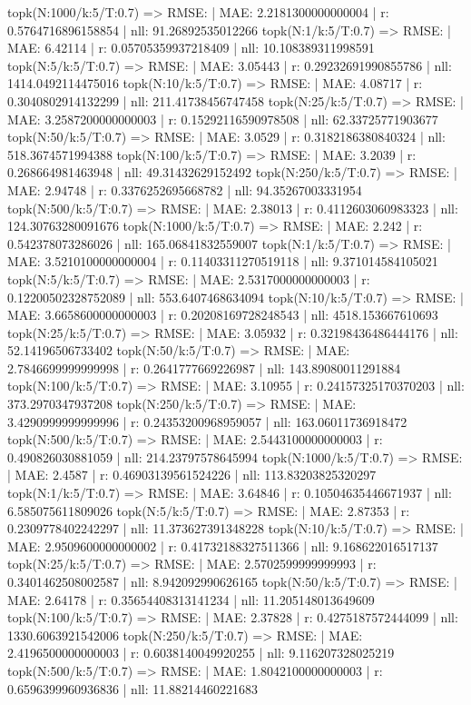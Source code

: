 topk(N:1000/k:5/T:0.7) => RMSE: | MAE: 2.2181300000000004 | r: 0.5764716896158854 | nll: 91.26892535012266
topk(N:1/k:5/T:0.7) => RMSE: | MAE: 6.42114 | r: 0.05705359937218409 | nll: 10.108389311998591
topk(N:5/k:5/T:0.7) => RMSE: | MAE: 3.05443 | r: 0.29232691990855786 | nll: 1414.0492114475016
topk(N:10/k:5/T:0.7) => RMSE: | MAE: 4.08717 | r: 0.3040802914132299 | nll: 211.41738456747458
topk(N:25/k:5/T:0.7) => RMSE: | MAE: 3.2587200000000003 | r: 0.15292116590978508 | nll: 62.33725771903677
topk(N:50/k:5/T:0.7) => RMSE: | MAE: 3.0529 | r: 0.3182186380840324 | nll: 518.3674571994388
topk(N:100/k:5/T:0.7) => RMSE: | MAE: 3.2039 | r: 0.268664981463948 | nll: 49.31432629152492
topk(N:250/k:5/T:0.7) => RMSE: | MAE: 2.94748 | r: 0.3376252695668782 | nll: 94.35267003331954
topk(N:500/k:5/T:0.7) => RMSE: | MAE: 2.38013 | r: 0.4112603060983323 | nll: 124.30763280091676
topk(N:1000/k:5/T:0.7) => RMSE: | MAE: 2.242 | r: 0.542378073286026 | nll: 165.06841832559007
topk(N:1/k:5/T:0.7) => RMSE: | MAE: 3.5210100000000004 | r: 0.11403311270519118 | nll: 9.371014584105021
topk(N:5/k:5/T:0.7) => RMSE: | MAE: 2.5317000000000003 | r: 0.12200502328752089 | nll: 553.6407468634094
topk(N:10/k:5/T:0.7) => RMSE: | MAE: 3.6658600000000003 | r: 0.20208169728248543 | nll: 4518.153667610693
topk(N:25/k:5/T:0.7) => RMSE: | MAE: 3.05932 | r: 0.32198436486444176 | nll: 52.14196506733402
topk(N:50/k:5/T:0.7) => RMSE: | MAE: 2.7846699999999998 | r: 0.2641777669226987 | nll: 143.89080011291884
topk(N:100/k:5/T:0.7) => RMSE: | MAE: 3.10955 | r: 0.24157325170370203 | nll: 373.2970347937208
topk(N:250/k:5/T:0.7) => RMSE: | MAE: 3.4290999999999996 | r: 0.24353200968959057 | nll: 163.06011736918472
topk(N:500/k:5/T:0.7) => RMSE: | MAE: 2.5443100000000003 | r: 0.490826030881059 | nll: 214.23797578645994
topk(N:1000/k:5/T:0.7) => RMSE: | MAE: 2.4587 | r: 0.46903139561524226 | nll: 113.83203825320297
topk(N:1/k:5/T:0.7) => RMSE: | MAE: 3.64846 | r: 0.10504635446671937 | nll: 6.585075611809026
topk(N:5/k:5/T:0.7) => RMSE: | MAE: 2.87353 | r: 0.2309778402242297 | nll: 11.373627391348228
topk(N:10/k:5/T:0.7) => RMSE: | MAE: 2.9509600000000002 | r: 0.41732188327511366 | nll: 9.168622016517137
topk(N:25/k:5/T:0.7) => RMSE: | MAE: 2.5702599999999993 | r: 0.3401462508002587 | nll: 8.942092990626165
topk(N:50/k:5/T:0.7) => RMSE: | MAE: 2.64178 | r: 0.35654408313141234 | nll: 11.205148013649609
topk(N:100/k:5/T:0.7) => RMSE: | MAE: 2.37828 | r: 0.4275187572444099 | nll: 1330.6063921542006
topk(N:250/k:5/T:0.7) => RMSE: | MAE: 2.4196500000000003 | r: 0.6038140049920255 | nll: 9.116207328025219
topk(N:500/k:5/T:0.7) => RMSE: | MAE: 1.8042100000000003 | r: 0.6596399960936836 | nll: 11.88214460221683
